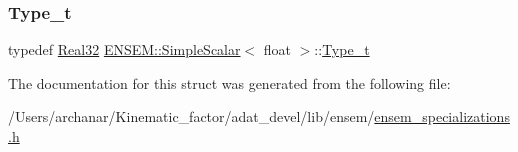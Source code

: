 \mbox{\label{structENSEM_1_1SimpleScalar_3_01float_01_4_a941f810256ed04a2e1880d93b6d09c9b}} 
\subsubsection{\texorpdfstring{Type\_t}{Type\_t}\hspace{0.1cm}{\footnotesize\ttfamily [2/2]}}
{\footnotesize\ttfamily typedef \mbox{\hyperlink{group__defs_gab601f1c55eb75baed0a0859b3fec6bc1}{Real32}} \mbox{\hyperlink{structENSEM_1_1SimpleScalar}{E\+N\+S\+E\+M\+::\+Simple\+Scalar}}$<$ float $>$\+::\mbox{\hyperlink{structENSEM_1_1SimpleScalar_3_01float_01_4_a941f810256ed04a2e1880d93b6d09c9b}{Type\+\_\+t}}}



The documentation for this struct was generated from the following file\+:\begin{DoxyCompactItemize}
\item 
/\+Users/archanar/\+Kinematic\+\_\+factor/adat\+\_\+devel/lib/ensem/\mbox{\hyperlink{lib_2ensem_2ensem__specializations_8h}{ensem\+\_\+specializations.\+h}}\end{DoxyCompactItemize}
